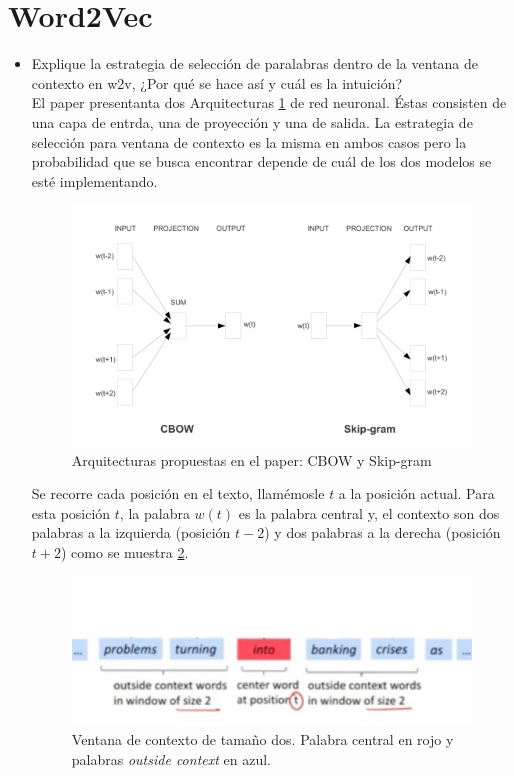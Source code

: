 \documentclass[letter, 11pt, twoside]{report}
\begin{document}
\section*{Word2Vec}
\begin{itemize}
    \item Explique la estrategia de selección de paralabras dentro de la ventana de contexto en w2v, ¿Por qué se hace así y cuál es la intuición?\\
    El paper presentanta dos Arquitecturas \ref{cbowyskipgram} de red neuronal. Éstas consisten de una capa de entrda, una de proyección y una de salida. La estrategia de selección para ventana de contexto es la misma en ambos casos pero la probabilidad que se busca encontrar depende de cuál de los dos modelos se esté implementando.
    \begin{figure}[H]
      \begin{center}
        \includegraphics[scale=0.15]{models.jpeg}
        \caption{Arquitecturas propuestas en el paper: CBOW y Skip-gram}
        \label{cbowyskipgram}
      \end{center}
    \end{figure}
    
    Se recorre cada posición en el texto, llamémosle $t$ a la posición actual. Para esta posición $t$, la palabra $w(t)$ es la palabra central y, el contexto son dos palabras a la izquierda (posición $t-2$) y dos palabras a la derecha (posición $t+2$) como se muestra \ref{context}.
    \begin{figure}[H]
      \begin{center}
        \includegraphics[scale=0.18]{Lenguaje_clase14_word2vec.jpeg}
        \caption{Ventana de contexto de tamaño dos. Palabra central en rojo y palabras \textit{outside context} en azul.}
        \label{context}
      \end{center}
    \end{figure}


\end{itemize}
\end{document}
